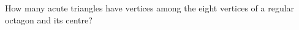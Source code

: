 How many acute triangles have vertices among the eight vertices of a regular octagon and its centre?
